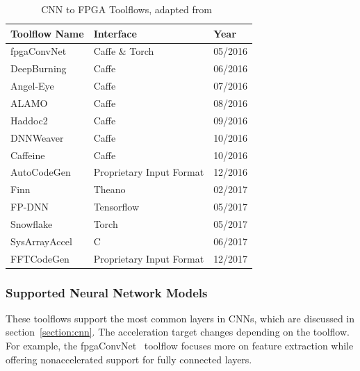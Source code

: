 \documentclass[conference]{IEEEtran}
\begin{document}
\begin{table}[!htp]
    \centering
    \begin{tabular}{|l|l|l|}
    \hline
    \textbf{Toolflow Name} & \textbf{Interface}       & \textbf{Year}  \\ \hline
    fpgaConvNet            & Caffe \& Torch           & 05/2016       \\ \hline
    DeepBurning            & Caffe                    & 06/2016      \\\hline
    Angel-Eye              & Caffe                    & 07/2016      \\\hline
    ALAMO                  & Caffe                    & 08/2016    \\\hline
    Haddoc2                & Caffe                    & 09/2016 \\\hline
    DNNWeaver              & Caffe                    & 10/2016   \\\hline
    Caffeine               & Caffe                    & 10/2016  \\\hline
    AutoCodeGen            & Proprietary Input Format & 12/2016  \\\hline
    Finn                   & Theano                   & 02/2017  \\\hline
    FP-DNN                 & Tensorflow               & 05/2017       \\\hline
    Snowflake              & Torch                    & 05/2017       \\\hline
    SysArrayAccel          & C                        & 06/2017      \\\hline
    FFTCodeGen             & Proprietary Input Format & 12/2017  \\ \hline
    \end{tabular}
    \linebreak
    \label{table:toolflow}
    \caption{CNN to FPGA Toolflows, adapted from~\cite{misc:cnntofpga}}
\end{table}


\subsubsection{Supported Neural Network Models}

These toolflows support the most common layers in CNNs, which are discussed in
section~\ref{section:cnn}. The acceleration target changes depending on the
toolflow.  For example, the fpgaConvNet~\cite{fpgaconvnet} toolflow focuses more
on feature extraction while offering nonaccelerated support for fully connected
layers.
\end{document}

